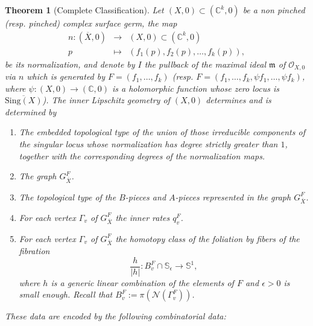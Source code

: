 \documentclass[reqno,dvipsnames,12pt]{amsart}
\newtheorem{thm}{Theorem}[section]
\begin{document}
 

\begin{thm}[Complete Classification]\label{megathmdelamortquitue}
Let $(X,0) \subset (\mathbb{C}^k,0)$ be a  non pinched  (resp. pinched) complex surface germ, the map 
\[
\begin{array}{ccc}
n:(\overline{X},0) & \longrightarrow & (X,0) \subset (\mathbb{C}^k,0) \\
p & \longmapsto & (f_1(p),f_2(p),\dots,f_k(p)),
\end{array}
\]
be its normalization, and denote by $I$ the pullback of the maximal ideal $\mathfrak{m}$ of $\mathcal{O}_{X,0}$ via $n$ which is generated by $F=(f_1,\dots,f_k)$ (resp.
$F=(f_1,\dots,f_k,\psi f_1,\dots,\psi f_k)$, where $\psi:(X,0)\to(\mathbb{C},0)$ is a holomorphic function whose zero locus is  $\overline{\mathrm{Sing}(X)}$). The inner Lipschitz geometry of $(X,0)$ determines and is determined by
\begin{enumerate}

\item The embedded topological type of the union of those irreducible components of the singular locus whose normalization has degree strictly greater than $1$, together with the corresponding degrees of the normalization maps. \label{letypetopologiquedulieusingulier}
     \item The graph $G_{\overline{X}}^{F}$. \label{lepoint2dudernier}
     \item The topological type of the $B$-pieces and $A$-pieces represented in the graph $G_{\overline{X}}^{F}$.\label{lepoint3dudernier}
     \item For each vertex $\Gamma_{v}$ of $G_{\overline{X}}^{F}$ the inner rates $q_v^{F}$.\label{lepoint4dudernier}
    \item For each vertex $\Gamma_{v}$ of $G_{\overline{X}}^{F}$ the homotopy class of the foliation by fibers of the fibration $$\frac{h}{|h|}:B_v^{F} \cap \mathbb{S}_{\epsilon} \longrightarrow \mathbb{S}^1,$$ where $h$ is a generic linear combination of the elements of  $F$ and $\epsilon>0$ is small enough. Recall that $B_v^{F}:=\pi(\mathcal{N}(\Gamma_v^F))$.\label{lepoint5dudernier}
    

\end{enumerate}
These data are encoded by the following combinatorial data:














\end{thm}
\end{document}
